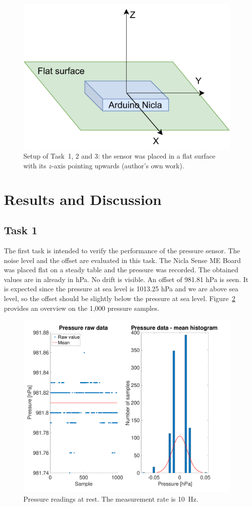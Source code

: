 \documentclass[DIV=14]{scrartcl}
\begin{document}
    \begin{figure}[h]
        \centering
        \includegraphics[width=.6\textwidth]{figures/Setup1and2}
        \caption{Setup of Task~1, 2 and 3: the sensor was placed in a flat surface with its $z$-axis pointing upwards
            (author's own work).}
        \label{fig:setup}
    \end{figure}

    \clearpage


    \section{Results and Discussion}

    \subsection*{Task 1}
    The first task is intended to verify the performance of the pressure sensor.
    The noise level and the offset are evaluated in this task.
    The Nicla Sense ME Board was placed flat on a steady table and the pressure was recorded.
    The obtained values are in already in \si{\hecto\pascal}.
    No drift is visible.
    An offset of 981.81 \si{\hecto\pascal} is seen.
    It is expected since the pressure at sea level is 1013.25 \si{\hecto\pascal} and we are above sea level,
    so the offset should be slightly below the pressure at sea level.
    Figure~\ref{fig:plotPressure} provides an overview on the 1,000 pressure samples.

    \begin{figure}[h]
        \centering
        \includegraphics[width=.6\textwidth]{plots/plotPressure}
        \caption{Pressure readings at rest. The measurement rate is \SI{10}{\hertz}.}
        \label{fig:plotPressure}
    \end{figure}
\end{document}
